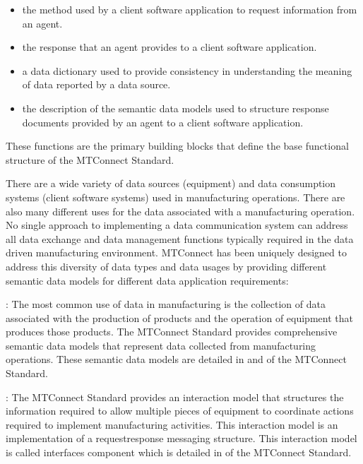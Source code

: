 \documentclass{mtconnect}	%
\begin{document}
\begin{itemize}

\item the method used by a client software application to request information from an \gls{agent}.

\item the response that an \gls{agent} provides to a client software application.

\item a \gls{data dictionary} used to provide consistency in understanding the meaning of data reported by a data source.

\item the description of the \glspl{semantic data model} used to structure \glspl{response document} provided by an \gls{agent} to a client software application.

\end{itemize}

These functions are the primary building blocks that define the \gls{base functional structure} of the MTConnect Standard.

There are a wide variety of data sources (equipment) and data consumption systems (client software systems) used in manufacturing operations.  There are also many different uses for the data associated with a manufacturing operation.  No single approach to implementing a data communication system can address all data exchange and data management functions typically required in the data driven manufacturing environment.  MTConnect has been uniquely designed to address this diversity of data types and data usages by providing different \glspl{semantic data model} for different data application requirements:

: The most common use of data in manufacturing is the collection of data associated with the production of products and the operation of equipment that produces those products.  The MTConnect Standard provides comprehensive \glspl{semantic data model} that represent data collected from manufacturing operations.  These \glspl{semantic data model} are detailed in  and  of the MTConnect Standard.

:  The MTConnect Standard provides an \gls{interaction model} that structures the information required to allow multiple pieces of equipment to coordinate actions required to implement manufacturing activities.  This \gls{interaction model} is an implementation of a \gls{requestresponse}  messaging structure.  This \gls{interaction model} is called \gls{interfaces component} which is detailed in  of the MTConnect Standard.
\end{document}
